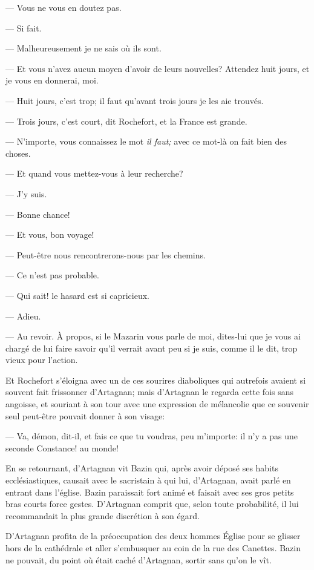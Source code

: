 — Vous ne vous en doutez pas.

— Si fait.

— Malheureusement je ne sais où ils sont.

— Et vous n'avez aucun moyen d'avoir de leurs nouvelles? Attendez huit jours, et je vous en donnerai, moi.

— Huit jours, c'est trop; il faut qu'avant trois jours je les aie trouvés.

— Trois jours, c'est court, dit Rochefort, et la France est grande.

— N'importe, vous connaissez le mot \textit{il faut;} avec ce mot-là on fait bien des choses.

— Et quand vous mettez-vous à leur recherche?

— J'y suis.

— Bonne chance!

— Et vous, bon voyage!

— Peut-être nous rencontrerons-nous par les chemins.

— Ce n'est pas probable.

— Qui sait! le hasard est si capricieux.

— Adieu.

— Au revoir. À propos, si le Mazarin vous parle de moi, dites-lui que je vous ai chargé de lui faire savoir qu'il verrait avant peu si je suis, comme il le dit, trop vieux pour l'action.

Et Rochefort s'éloigna avec un de ces sourires diaboliques qui autrefois avaient si souvent fait frissonner d'Artagnan; mais d'Artagnan le regarda cette fois sans angoisse, et souriant à son tour avec une expression de mélancolie que ce souvenir seul peut-être pouvait donner à son visage:

— Va, démon, dit-il, et fais ce que tu voudras, peu m'importe: il n'y a pas une seconde Constance! au monde!

En se retournant, d'Artagnan vit Bazin qui, après avoir déposé ses habits ecclésiastiques, causait avec le sacristain à qui lui, d'Artagnan, avait parlé en entrant dans l'église. Bazin paraissait fort animé et faisait avec ses gros petits bras courts force gestes. D'Artagnan comprit que, selon toute probabilité, il lui recommandait la plus grande discrétion à son égard.

D'Artagnan profita de la préoccupation des deux hommes Église pour se glisser hors de la cathédrale et aller s'embusquer au coin de la rue des Canettes. Bazin ne pouvait, du point où était caché d'Artagnan, sortir sans qu'on le vît.

